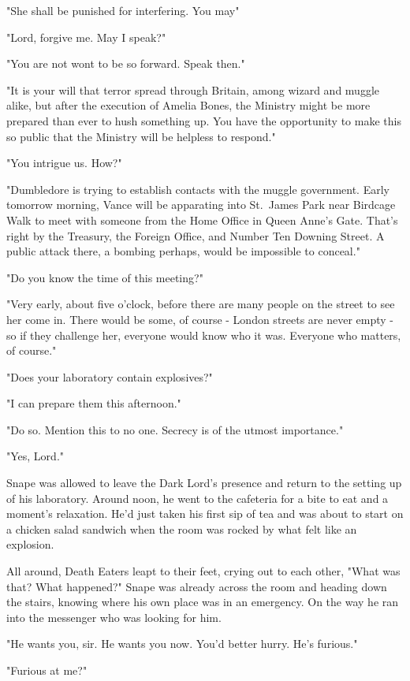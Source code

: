 "She shall be punished for interfering. You may{\el}"

"Lord, forgive me. May I speak?"

"You are not wont to be so forward. Speak then."

"It is your will that terror spread through Britain, among wizard and muggle alike, but after the execution of Amelia Bones, the Ministry might be more prepared than ever to hush something up. You have the opportunity to make this so public that the Ministry will be helpless to respond."

"You intrigue us. How?"

"Dumbledore is trying to establish contacts with the muggle government. Early tomorrow morning, Vance will be apparating into St.~James Park near Birdcage Walk to meet with someone from the Home Office in Queen Anne's Gate. That's right by the Treasury, the Foreign Office, and Number Ten Downing Street. A public attack there, a bombing perhaps, would be impossible to conceal."

"Do you know the time of this meeting?"

"Very early, about five o'clock, before there are many people on the street to see her come in. There would be some, of course - London streets are never empty - so if they challenge her, everyone would know who it was. Everyone who matters, of course."

"Does your laboratory contain explosives?"

"I can prepare them this afternoon."

"Do so. Mention this to no one. Secrecy is of the utmost importance."

"Yes, Lord."

Snape was allowed to leave the Dark Lord's presence and return to the setting up of his laboratory. Around noon, he went to the cafeteria for a bite to eat and a moment's relaxation. He'd just taken his first sip of tea and was about to start on a chicken salad sandwich when the room was rocked by what felt like an explosion.

All around, Death Eaters leapt to their feet, crying out to each other, "What was that? What happened?" Snape was already across the room and heading down the stairs, knowing where his own place was in an emergency. On the way he ran into the messenger who was looking for him.

"He wants you, sir. He wants you now. You'd better hurry. He's furious."

"Furious at me?"

